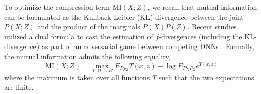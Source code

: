 \documentclass[10pt,journal,compsoc]{IEEEtran}
\begin{document}
To optimize the compression term $\mathrm{MI}(X; Z)$, we recall that mutual information can be formulated as the Kullback-Leibler ($\mathrm{KL}$) divergence between the joint $P(X; Z)$ and the product of the marginals $P(X)P(Z)$. Recent studies utilized a dual formula to cast the estimation of $f$-divergences \cite{Nowozin2016fGANTG,Donsker1975AsymptoticEO,Belghazi2018MutualIN} (including the $\mathrm{KL}$-divergence) as part of an adversarial game between competing DNNs \cite{Nguyen2017DualDG}. Formally, the mutual information admits the following equality,
\begin{equation}
\mathrm{MI}(X; Z) = \max_{T:\Omega \rightarrow R}E_{P_{XZ}}T(x,z)-\log E_{P_{X}P_{Z}}e^{T(x,z)}
\label{eq:dual_kl}
\end{equation}
where the maximum is taken over all functions $T$ such that the two expectations are finite.\\
\end{document}
